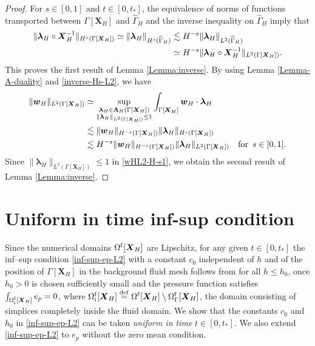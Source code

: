 \documentclass[11pt,reqno]{amsart}
\theoremstyle{definition}
\theoremstyle{plain}
\numberwithin{theorem}{section}
\numberwithin{proposition}{section}
\numberwithin{lemma}{section}
\numberwithin{equation}{section}
\newcommand{\bs}[1]{\boldsymbol{#1}}
\renewcommand{\(}{\bigl(}
\renewcommand{\)}{\bigr)}
\newcommand{\bX}{{\bm X}}
\def\eqd{\stackrel{\mathrm{def}}{=}}
\begin{document}
\begin{proof}
For $s\in[0,1]$ and $t\in[0,t_*]$, the equivalence of norms of functions transported between $\Gamma[{\bs X}_H]$ and $\widehat\Gamma_H$ and the inverse inequality on $\widehat\Gamma_H$ imply that 
\begin{align}\label{inverse-Hs-L2}
\| {\bs\lambda}_H \circ {\bs X}_H^{-1} \|_{H^s(\Gamma[{\bs X}_H])}
\simeq \|{\bs\lambda}_H \|_{H^s(\widehat\Gamma_H)} 
&\lesssim H^{-s}\|{\bs\lambda}_H \|_{L^2(\widehat\Gamma_H)} \notag\\
&\simeq H^{-s}\|{\bs\lambda}_H \circ {\bs X}_H^{-1} \|_{L^2(\Gamma[{\bs X}_H])} . 
\end{align} 
This proves the first result of Lemma \ref{Lemma:inverse}. By using Lemma \ref{Lemma-A-duality} and \eqref{inverse-Hs-L2}, we have 
\begin{align}\label{wHL2-H-s1}
\|{\bs w}_H\|_{L^2(\Gamma[{\bs X}_H])}
&\simeq \sup_{\substack{{\bs\lambda}_H\in {\bs\Lambda}_H(\Gamma[{\bs X}_H])\\ \|{\bs\lambda}_H\|_{L^2(\Gamma[{\bs X}_H])}\le 1}} 
\int_{\Gamma[{\bs X}_H]} {\bs w}_H\cdot {\bs\lambda}_H \\
&\lesssim \|{\bs w}_H\|_{H^{-s}(\Gamma[{\bs X}_H])} \|{\bs\lambda}_H \|_{H^s(\Gamma[{\bs X}_H])} \notag\\
&\lesssim H^{-s}\|{\bs w}_H\|_{H^{-s}(\Gamma[{\bs X}_H])} \|{\bs\lambda}_H \|_{L^2(\Gamma[{\bs X}_H])} \quad\mbox{for}\,\,\, s\in[0,1] . \notag
\end{align}
Since $\|{\bs\lambda}_H\|_{L^2(\Gamma[{\bs X}_H])}\le 1$ in \eqref{wHL2-H-s1}, we obtain the second result of Lemma \ref{Lemma:inverse}. 
\end{proof}


\section{Uniform in time inf-sup condition}\label{appendix:inf-sup}

Since the numerical domains $\Omega^{\rm f}[{\bs X}_H]$ are Lipschitz, for any given 
$t\in[0,t_*]$ the inf--sup condition \eqref{inf-sup-ep-L2} with a constant $c_0$ 
independent of $h$ and of the position of $\Gamma[\bX_H]$ in the background fluid mesh 
follows from \cite[Corollary~1]{GuzmOlsh} for all $h\le h_0$, once $h_0>0$ is chosen 
sufficiently small and the pressure function satisfies $\int_{\Omega^{\rm f}_{\rm i}[{\bs X}_H]}e_p=0$, where 
$\Omega^{\rm f}_{\rm i}[{\bs X}_H]\eqd \Omega^{\rm f}[{\bs X}_H]\setminus \Omega^{\rm f}_{\Gamma}[{\bs X}_H]$, the domain consisting of simplices completely inside the fluid domain. We  show that the constants $c_0$ and $h_0$ in 
\eqref{inf-sup-ep-L2} can be taken \emph{uniform in time} $t\in[0,t_*]$.  We also extend \eqref{inf-sup-ep-L2} to $e_p$ without the zero mean condition. 
\end{document}
